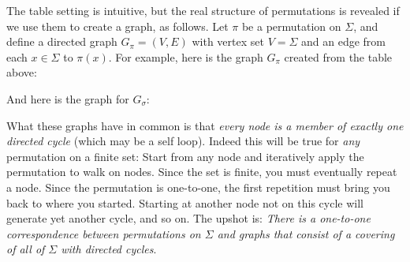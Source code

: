 \documentclass[11pt]{article}
\begin{document}
The table setting is intuitive, but the real structure of permutations
is revealed if we use them to create a graph, as follows. Let $\pi$
be a permutation on $\Sigma$, and define a directed
graph $G_\pi = (V,E)$ with vertex set $V=\Sigma$ and an edge from
each $x\in\Sigma$ to $\pi(x)$. For example, here is the graph
$G_\pi$ created from the table above:
\begin{center}
\end{center}
And here is the graph for $G_\sigma$:
\begin{center}
\end{center}
What these graphs have in common is that \emph{every node is a member of
exactly one directed cycle} (which may be a self loop). Indeed this will be
true for \emph{any} permutation on a finite set: Start from any node and
iteratively apply the permutation to walk on nodes. Since the set is
finite, you must eventually repeat a node. Since the permutation is
one-to-one, the first repetition must bring you back to where you started.
Starting at another node not on this cycle will generate yet another
cycle, and so on. The upshot is: 
\emph{There is a one-to-one
correspondence between permutations on $\Sigma$ and graphs that consist of a
covering of all of $\Sigma$ with directed cycles}.
\end{document}
